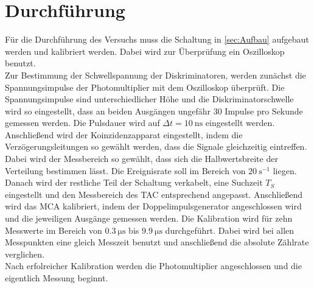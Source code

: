 \section{Durchführung}
\label{sec:Durchführung}
Für die Durchführung des Versuchs muss die Schaltung in \autoref{sec:Aufbau} aufgebaut werden und kalibriert werden.
Dabei wird zur Überprüfung ein Oszilloskop benutzt.\\
Zur Bestimmung der Schwellspannung der Diskriminatoren, werden zunächst die Spannungsimpulse der Photomultiplier mit dem Oszilloskop überprüft.
Die Spannungsimpulse sind unterschiedlicher Höhe und die Diskriminatorschwelle wird so eingestellt, dass an beiden Ausgängen ungefähr $30$ Impulse pro Sekunde gemessen werden.
Die Pulsdauer wird auf $\Delta t = \qty{10}{\nano\second}$ eingestellt werden.\\
Anschließend wird der Koinzidenzapparat eingestellt, indem die Verzögerungsleitungen so gewählt werden, dass die Signale gleichzeitig eintreffen. Dabei wird der Messbereich so gewählt,
dass sich die Halbwertsbreite der Verteilung bestimmen lässt. Die Ereignisrate soll im Bereich von $\qty{20}{\second^{-1}}$ liegen.\\
Danach wird der restliche Teil der Schaltung verkabelt, eine Suchzeit $T_S$ eingestellt und den Messbereich des TAC entsprechend angepasst.
Anschließend wird das MCA kalibriert, indem der Doppelimpulsgenerator angeschlossen wird und die jeweiligen Ausgänge gemessen werden. Die Kalibration wird für zehn Messwerte im Bereich von
$\qty{0.3}{\micro\second}$ bis  $\qty{9.9}{\micro\second}$ durchgeführt. Dabei wird bei allen Messpunkten eine gleich Messzeit benutzt und anschließend die absolute Zählrate verglichen.\\
Nach erfolreicher Kalibration werden die Photomultiplier angeschlossen und die eigentlich Messung beginnt.

